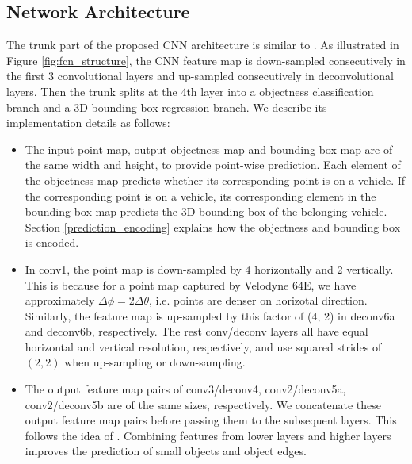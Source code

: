 \documentclass[conference]{IEEEtran}
\begin{document}
\subsection{Network Architecture}
\label{sec:network_architecture}

The trunk part of the proposed CNN architecture is similar to \citet{Huang2015, Long}. As illustrated in Figure \ref{fig:fcn_structure}, the CNN feature map is down-sampled consecutively in the first 3 convolutional layers and up-sampled consecutively in deconvolutional layers. Then the trunk splits at the 4th layer into a objectness classification branch and a 3D bounding box regression branch. We describe its implementation details as follows:
\begin{itemize}
\item The input point map, output objectness map and bounding box map are of the same width and height, to provide point-wise prediction. Each element of the objectness map predicts whether its corresponding point is on a vehicle. If the corresponding point is on a vehicle, its corresponding element in the bounding box map predicts the 3D bounding box of the belonging vehicle. Section \ref{prediction_encoding} explains how the objectness and bounding box is encoded.
\item In conv1, the point map is down-sampled by 4 horizontally and 2 vertically. This is because for a point map captured by Velodyne 64E, we have approximately $\Delta \phi = 2 \Delta \theta$, i.e. points are denser on horizotal direction. Similarly, the feature map is up-sampled by this factor of (4, 2) in deconv6a and deconv6b, respectively. The rest conv/deconv layers all have equal horizontal and vertical resolution, respectively, and use squared strides of $(2, 2)$ when up-sampling or down-sampling.
\item The output feature map pairs of conv3/deconv4, conv2/deconv5a, conv2/deconv5b are of the same sizes, respectively. We concatenate these output feature map pairs before passing them to the subsequent layers. This follows the idea of \citet{Long}. Combining features from lower layers and higher layers improves the prediction of small objects and object edges. 
\end{itemize}
\end{document}
